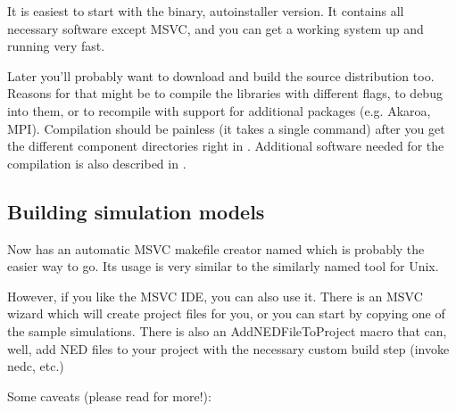 It is easiest to start with the binary, autoinstaller version.
It contains all necessary software except MSVC,
and you can get a working system up and running very fast.

Later you'll probably want to download and build the source
distribution too. Reasons for that might be to compile the libraries
with different flags, to debug into them, or to recompile
with support for additional packages (e.g. Akaroa, MPI).
Compilation should be painless (it takes a single
 command) after you get the different
component directories right in .
Additional software needed for the compilation is also described
in .

\subsection{Building simulation models}

Now {\opp} has an automatic MSVC makefile creator named 
which is probably the easier way to go. Its usage is very similar
to the similarly named tool for Unix.

However, if you like the MSVC IDE, you can also use it.
There is an MSVC wizard which will create project files for you,
or you can start by copying one of the sample simulations.
There is also an AddNEDFileToProject macro that can, well, add
NED files to your project with the necessary custom build step
(invoke nedc, etc.)

Some caveats (please read  for more!):

